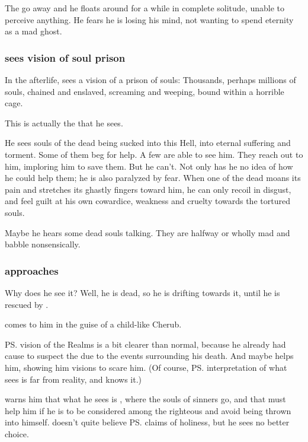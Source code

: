 \begin{garbage}
The \daemons{} go away and he floats around for a while in complete solitude, unable to perceive anything. He fears he is losing his mind, not wanting to spend eternity as a mad ghost. 






\subsubsection{\Icor{} sees vision of soul prison}
In the afterlife, \Icor{} sees a vision of a prison of souls: Thousands, perhaps millions of souls, chained and enslaved, screaming and weeping, bound within a horrible cage. 

This is actually the \Sephiroth{} that he sees. 

He sees souls of the dead being sucked into this Hell, into eternal suffering and torment. Some of them beg for help. A few are able to see him. They reach out to him, imploring him to save them. But he can't. Not only has he no idea of how he could help them; he is also paralyzed by fear. When one of the dead moans its pain and stretches its ghastly fingers toward him, he can only recoil in disgust, and feel guilt at his own cowardice, weakness and cruelty towards the tortured souls. 

Maybe he hears some dead souls talking. They are halfway or wholly mad and babble nonsensically. 






\subsubsection{\Psyrex{} approaches \Icor}
Why does he see it? 
Well, he is dead, so he is drifting towards it, until he is rescued by \Psyrex. 

\Psyrex{} comes to him in the guise of a child-like Cherub. 
 
\ps{\Icor} vision of the Realms is a bit clearer than normal, because he already had cause to suspect the \Sephiroth{} due to the events surrounding his death. 
And maybe \Psyrex{} helps him, showing him visions to scare him. 
(Of course, \ps{\Psyrex}{} interpretation of what \Icor{} sees is far from reality, and \Psyrex{} knows it.)

\Psyrex{} warns him that what he sees is \Itzach, where the souls of sinners go, and that \Icor{} must help him if he is to be considered among the righteous and avoid being thrown into \Itzach{} himself. 
\Icor{} doesn't quite believe \ps{\Psyrex}{} claims of holiness, but he sees no better choice. 








\end{garbage}

